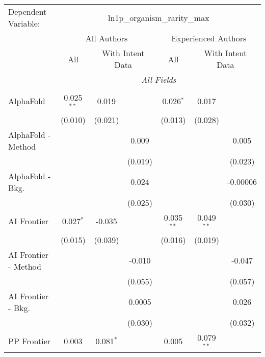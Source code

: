 \begingroup
\centering
\begin{tabular}{lcccccc}
   \tabularnewline \midrule \midrule
   Dependent Variable: & \multicolumn{6}{c}{ln1p\_organism\_rarity\_max}\\
 & \multicolumn{3}{c}{All Authors} & \multicolumn{3}{c}{Experienced Authors} \\
\cmidrule(lr){2-4} \cmidrule(lr){5-7}
 & \multicolumn{1}{c}{All} & \multicolumn{2}{c}{With Intent Data} & \multicolumn{1}{c}{All} & \multicolumn{2}{c}{With Intent Data} \\
\cmidrule(lr){2-2} \cmidrule(lr){3-4} \cmidrule(lr){5-5} \cmidrule(lr){6-7}
 & \multicolumn{6}{c}{\textit{All Fields}} \\ \\
   AlphaFold            & 0.025$^{**}$ & 0.019       &         & 0.026$^{*}$  & 0.017        &   \\   
                        & (0.010)      & (0.021)     &         & (0.013)      & (0.028)      &   \\   
   AlphaFold - Method   &              &             & 0.009   &              &              & 0.005\\   
                        &              &             & (0.019) &              &              & (0.023)\\   
   AlphaFold - Bkg.     &              &             & 0.024   &              &              & -0.00006\\   
                        &              &             & (0.025) &              &              & (0.030)\\   
   AI Frontier          & 0.027$^{*}$  & -0.035      &         & 0.035$^{**}$ & 0.049$^{**}$ &   \\   
                        & (0.015)      & (0.039)     &         & (0.016)      & (0.019)      &   \\   
   AI Frontier - Method &              &             & -0.010  &              &              & -0.047\\   
                        &              &             & (0.055) &              &              & (0.057)\\   
   AI Frontier - Bkg.   &              &             & 0.0005  &              &              & 0.026\\   
                        &              &             & (0.030) &              &              & (0.032)\\   
   PP Frontier          & 0.003        & 0.081$^{*}$ &         & 0.005        & 0.079$^{**}$ &   \\   

\end{tabular}
